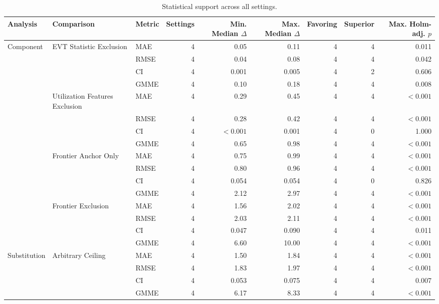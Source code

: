 \documentclass{article}
\begin{document}
\clearpage
\begin{table}[H]
\centering
\footnotesize
\captionsetup{position=top,skip=12pt}
\caption{Statistical support across all settings.}
\label{tab:si-support}
\setlength{\tabcolsep}{3pt}
\begin{tabularx}{\linewidth}{@{}l>{\raggedright\arraybackslash}Xlrrrrrr@{}}
\toprule
Analysis & Comparison & Metric & Settings & \shortstack{Min. Median\\$\Delta$} & \shortstack{Max. Median\\$\Delta$} & Favoring & Superior & \shortstack{Max. Holm-adj.\\$p$} \\
\midrule
Component & EVT Statistic Exclusion & MAE & 4 & 0.05 & 0.11 & 4 & 4 & 0.011 \\
 & & RMSE & 4 & 0.04 & 0.08 & 4 & 4 & 0.042 \\
 & & CI & 4 & 0.001 & 0.005 & 4 & 2 & 0.606 \\
 & & GMME & 4 & 0.10 & 0.18 & 4 & 4 & 0.008 \\
\addlinespace
 & Utilization Features Exclusion & MAE & 4 & 0.29 & 0.45 & 4 & 4 & $<0.001$ \\
 & & RMSE & 4 & 0.28 & 0.42 & 4 & 4 & $<0.001$ \\
 & & CI & 4 & $<0.001$ & 0.001 & 4 & 0 & 1.000 \\
 & & GMME & 4 & 0.65 & 0.98 & 4 & 4 & $<0.001$ \\
\addlinespace
 & Frontier Anchor Only & MAE & 4 & 0.75 & 0.99 & 4 & 4 & $<0.001$ \\
 & & RMSE & 4 & 0.80 & 0.96 & 4 & 4 & $<0.001$ \\
 & & CI & 4 & 0.054 & 0.054 & 4 & 0 & 0.826 \\
 & & GMME & 4 & 2.12 & 2.97 & 4 & 4 & $<0.001$ \\
\addlinespace
 & Frontier Exclusion & MAE & 4 & 1.56 & 2.02 & 4 & 4 & $<0.001$ \\
 & & RMSE & 4 & 2.03 & 2.11 & 4 & 4 & $<0.001$ \\
 & & CI & 4 & 0.047 & 0.090 & 4 & 4 & 0.011 \\
 & & GMME & 4 & 6.60 & 10.00 & 4 & 4 & $<0.001$ \\
\addlinespace
Substitution & Arbitrary Ceiling & MAE & 4 & 1.50 & 1.84 & 4 & 4 & $<0.001$ \\
 & & RMSE & 4 & 1.83 & 1.97 & 4 & 4 & $<0.001$ \\
 & & CI & 4 & 0.053 & 0.075 & 4 & 4 & 0.007 \\
 & & GMME & 4 & 6.17 & 8.33 & 4 & 4 & $<0.001$ \\

\end{tabularx}
\end{table}
\end{document}
